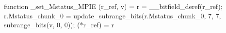 function _set_Mstatus_MPIE (r_ref, v) = {
    r = __bitfield_deref(r_ref);
    r.Mstatus_chunk_0 = update_subrange_bits(r.Mstatus_chunk_0, 7, 7, subrange_bits(v, 0, 0));
    (*r_ref) = r
}

